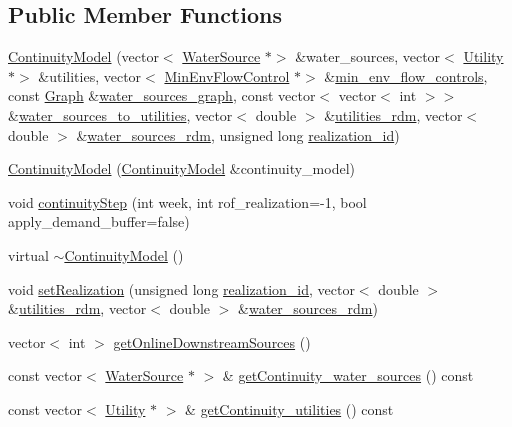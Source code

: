 \subsection*{Public Member Functions}
\begin{DoxyCompactItemize}
\item 
\mbox{\hyperlink{classContinuityModel_acadf595deb924bc08c9b702adf223365}{Continuity\+Model}} (vector$<$ \mbox{\hyperlink{classWaterSource}{Water\+Source}} $\ast$$>$ \&water\+\_\+sources, vector$<$ \mbox{\hyperlink{classUtility}{Utility}} $\ast$$>$ \&utilities, vector$<$ \mbox{\hyperlink{classMinEnvFlowControl}{Min\+Env\+Flow\+Control}} $\ast$$>$ \&\mbox{\hyperlink{classContinuityModel_afc991e5c0d144020e49a97751a04b302}{min\+\_\+env\+\_\+flow\+\_\+controls}}, const \mbox{\hyperlink{classGraph}{Graph}} \&\mbox{\hyperlink{classContinuityModel_a563401588c6fa622f03393909a3522db}{water\+\_\+sources\+\_\+graph}}, const vector$<$ vector$<$ int $>$$>$ \&\mbox{\hyperlink{classContinuityModel_ae8516bcbbf52650190277fc8b06c1843}{water\+\_\+sources\+\_\+to\+\_\+utilities}}, vector$<$ double $>$ \&\mbox{\hyperlink{classContinuityModel_aa4a00b76da6295d2faa11e3dcaea1896}{utilities\+\_\+rdm}}, vector$<$ double $>$ \&\mbox{\hyperlink{classContinuityModel_ab7b8fa93a6f56b328e425e1ead6cfefa}{water\+\_\+sources\+\_\+rdm}}, unsigned long \mbox{\hyperlink{classContinuityModel_a7b6c99bf256f6c6b633ebb78282f43c7}{realization\+\_\+id}})
\item 
\mbox{\hyperlink{classContinuityModel_a7f46eb1f937b813226ca7fee96e5fd5c}{Continuity\+Model}} (\mbox{\hyperlink{classContinuityModel}{Continuity\+Model}} \&continuity\+\_\+model)
\item 
void \mbox{\hyperlink{classContinuityModel_ad880b6cb48eb24e8b78cc5425d85313b}{continuity\+Step}} (int week, int rof\+\_\+realization=-\/1, bool apply\+\_\+demand\+\_\+buffer=false)
\item 
virtual \mbox{\hyperlink{classContinuityModel_a6644d91cc76b2ccc57103aa1a2ab0c03}{$\sim$\+Continuity\+Model}} ()
\item 
void \mbox{\hyperlink{classContinuityModel_a47504c599955b8193ffab3bd0f328144}{set\+Realization}} (unsigned long \mbox{\hyperlink{classContinuityModel_a7b6c99bf256f6c6b633ebb78282f43c7}{realization\+\_\+id}}, vector$<$ double $>$ \&\mbox{\hyperlink{classContinuityModel_aa4a00b76da6295d2faa11e3dcaea1896}{utilities\+\_\+rdm}}, vector$<$ double $>$ \&\mbox{\hyperlink{classContinuityModel_ab7b8fa93a6f56b328e425e1ead6cfefa}{water\+\_\+sources\+\_\+rdm}})
\item 
vector$<$ int $>$ \mbox{\hyperlink{classContinuityModel_a609fa24135a600af177d1460e0162014}{get\+Online\+Downstream\+Sources}} ()
\item 
const vector$<$ \mbox{\hyperlink{classWaterSource}{Water\+Source}} $\ast$ $>$ \& \mbox{\hyperlink{classContinuityModel_ae0dec8510ab216accd44097e5a366bd8}{get\+Continuity\+\_\+water\+\_\+sources}} () const
\item 
const vector$<$ \mbox{\hyperlink{classUtility}{Utility}} $\ast$ $>$ \& \mbox{\hyperlink{classContinuityModel_a922c1dea6e49d67c87a7fbb34c7bc623}{get\+Continuity\+\_\+utilities}} () const
\end{DoxyCompactItemize}
